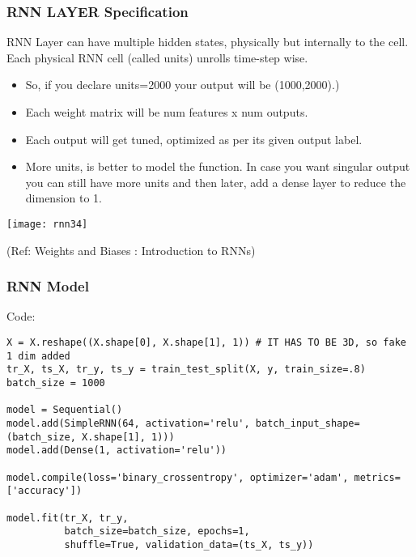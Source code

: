 \begin{frame}[fragile] \frametitle{RNN LAYER Specification}
RNN Layer can have multiple hidden states, physically but internally to the cell. Each physical RNN cell (called units) unrolls time-step wise.

\begin{itemize}
\item So, if you declare units=2000 your output will be (1000,2000).)
\item Each weight matrix will be num features x num outputs.
\item Each output will get tuned, optimized as per its given output label.
\item More units, is better to model the function. In case you want singular output you can still have more units and then later, add a dense layer to reduce the dimension to 1.
\end{itemize}

\begin{center}
\texttt{[image: rnn34]}

{\tiny (Ref: Weights and Biases : Introduction to RNNs)}

\end{center}


\end{frame}


\begin{frame}[fragile] \frametitle{RNN Model}
Code: 
\begin{lstlisting}
X = X.reshape((X.shape[0], X.shape[1], 1)) # IT HAS TO BE 3D, so fake 1 dim added
tr_X, ts_X, tr_y, ts_y = train_test_split(X, y, train_size=.8)
batch_size = 1000

model = Sequential()
model.add(SimpleRNN(64, activation='relu', batch_input_shape=(batch_size, X.shape[1], 1)))
model.add(Dense(1, activation='relu'))

model.compile(loss='binary_crossentropy', optimizer='adam', metrics=['accuracy'])

model.fit(tr_X, tr_y,
          batch_size=batch_size, epochs=1,
          shuffle=True, validation_data=(ts_X, ts_y))
\end{lstlisting}



\end{frame}

